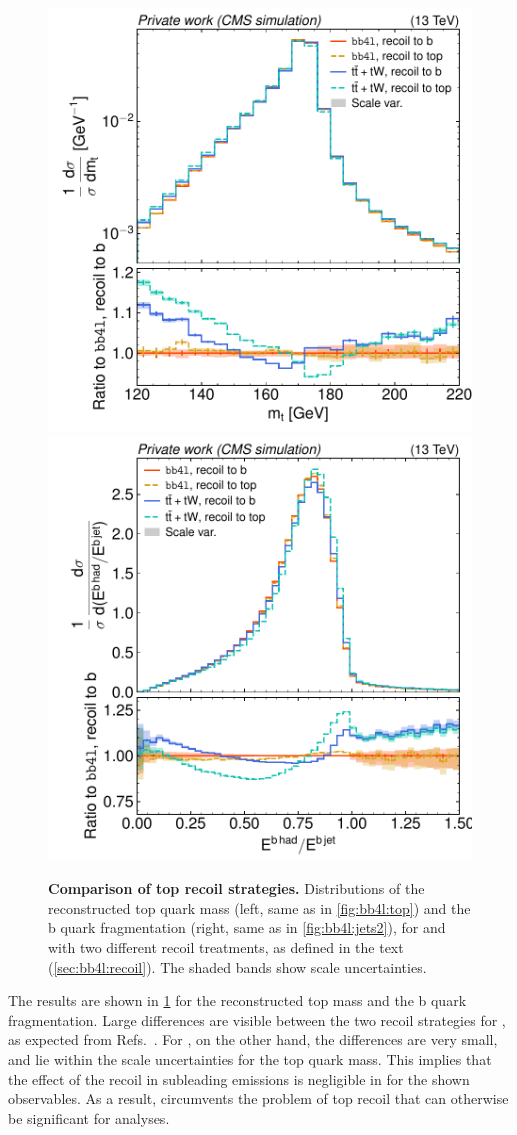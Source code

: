 \begin{figure}[tp]
    \centering
    \includegraphics[width=0.49 \textwidth]{figures/bb4l/recoil/MC_TTBAR_DILEP_SPINDENSITY_anytop_mass.pdf}
    \hfill
    \includegraphics[width=0.49 \textwidth]{figures/bb4l/recoil/MC_HFJETS_efracB.pdf}
    \caption{\textbf{Comparison of top recoil strategies.} Distributions of the reconstructed top quark mass (left, same as in \cref{fig:bb4l:top}) and the b quark fragmentation (right, same as in \cref{fig:bb4l:jets2}), for \bbfourl and \tttWsum with two different recoil treatments, as defined in the text (\cref{sec:bb4l:recoil}). The shaded bands show scale uncertainties.}
    \label{fig:bb4l:recoil}
\end{figure}

The results are shown in \cref{fig:bb4l:recoil} for the reconstructed top mass and the b quark fragmentation. Large differences are visible between the two recoil strategies for \tttWsum, as expected from Refs.~\cite{Brooks:2019xso,ATLAS:2022jbw}. For \bbfourl, on the other hand, the differences are very small, and lie within the scale uncertainties for the top quark mass. This implies that the effect of the recoil in subleading emissions is negligible in \bbfourl for the shown observables. As a result, \bbfourl circumvents the problem of top recoil that can otherwise be significant for \ttbar analyses.

